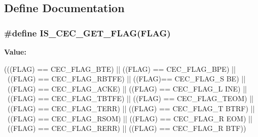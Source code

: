 \subsection{Define Documentation}
\hypertarget{group__CEC__flags__definition_ga929b30d90f6807e9f72976596b0b850b}{
\subsubsection[{IS\_\-CEC\_\-GET\_\-FLAG}]{\setlength{\rightskip}{0pt plus 5cm}\#define IS\_\-CEC\_\-GET\_\-FLAG(FLAG)}}
\label{group__CEC__flags__definition_ga929b30d90f6807e9f72976596b0b850b}
{\bfseries Value:}
\begin{DoxyCode}
(((FLAG) == CEC_FLAG_BTE) || ((FLAG) == CEC_FLAG_BPE) || \
                               ((FLAG) == CEC_FLAG_RBTFE) || ((FLAG)== CEC_FLAG_S
      BE) || \
                               ((FLAG) == CEC_FLAG_ACKE) || ((FLAG) == CEC_FLAG_L
      INE) || \
                               ((FLAG) == CEC_FLAG_TBTFE) || ((FLAG) == 
      CEC_FLAG_TEOM) || \
                               ((FLAG) == CEC_FLAG_TERR) || ((FLAG) == CEC_FLAG_T
      BTRF) || \
                               ((FLAG) == CEC_FLAG_RSOM) || ((FLAG) == CEC_FLAG_R
      EOM) || \
                               ((FLAG) == CEC_FLAG_RERR) || ((FLAG) == CEC_FLAG_R
      BTF))
\end{DoxyCode}

